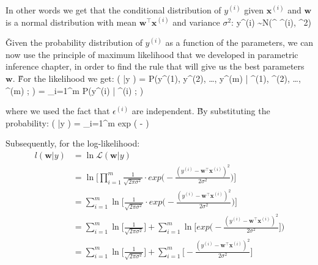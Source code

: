 In other words we get that the conditional distribution of $y^{(i)}$ given $\boldsymbol{x}^{(i)}$ and
$\boldsymbol{w}$ is a normal distribution with mean $\boldsymbol{w}^{\intercal} \boldsymbol{x}^{(i)}$ and variance
$\sigma^2$:
\bse
y^{(i)} \sim N(^{\intercal} ^{(i)}, \sigma^2)
\ese

\v

Given the probability distribution of $y^{(i)}$ as a function of the parameters, we can now use the principle of
maximum likelihood that we developed in parametric inference chapter, in order to find the rule that will give us the
best parameters $\boldsymbol{w}$. \v

For the likelihood we get:
\bse
{} ( |y ) = P(y^{(1)}, y^{(2)}, \ldots, y^{(m)} | ^{(1)}, ^{(2)},
\ldots, ^{(m)} ; ) = \prod_{i=1}^{m} P(y^{(i)} | ^{(i)} ; )
\ese

where we used the fact that $\epsilon^{(i)}$ are independent. \v

By substituting the probability:
\bse
{} ( |y ) = \prod_{i=1}^{m}  \cdot exp \Big( -  \Big)
\ese

Subsequently, for the log-likelihood:
{\setlength{\jot}{10pt}
\begin{align*}
l (\boldsymbol{w} |y ) &= \ln \mathcal{L} (\boldsymbol{w} |y ) \\
&= \ln \Big[ \prod_{i=1}^{m} \frac{1}{\sqrt{2 \pi \sigma^2}} \cdot
exp \Big( - \frac{(y^{(i)} - \boldsymbol{w}^{\intercal} \boldsymbol{x}^{(i)})^2}{2 \sigma^2} \Big) \Big] \\
&= \sum_{i=1}^{m} \ln \Big[ \frac{1}{\sqrt{2 \pi \sigma^2}} \cdot
exp \Big( - \frac{(y^{(i)} - \boldsymbol{w}^{\intercal} \boldsymbol{x}^{(i)})^2}{2 \sigma^2} \Big) \Big] \\
&= \sum_{i=1}^{m} \ln \Big[ \frac{1}{\sqrt{2 \pi \sigma^2}} \Big] + \sum_{i=1}^{m}
\ln \Big[ exp \Big( - \frac{(y^{(i)} - \boldsymbol{w}^{\intercal} \boldsymbol{x}^{(i)})^2}{2 \sigma^2} \Big] \Big) \\
&= \sum_{i=1}^{m} \ln \Big[ \frac{1}{\sqrt{2 \pi \sigma^2}} \Big] +
\sum_{i=1}^{m} \Big[ - \frac{(y^{(i)} - \boldsymbol{w}^{\intercal} \boldsymbol{x}^{(i)})^2}{2 \sigma^2} \Big]
\end{align*}}

